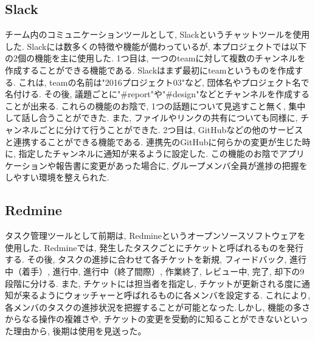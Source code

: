 \subsection{Slack}%
チーム内のコミュニケーションツールとして, Slackというチャットツールを使用した. Slackには数多くの特徴や機能が備わっているが, 本プロジェクトでは以下の2個の機能を主に使用した. 1つ目は, 一つのteamに対して複数のチャンネルを作成することができる機能である. Slackはまず最初にteamというものを作成する. これは, teamの名前は"2016プロジェクト03"など, 団体名やプロジェクト名で名付ける. その後, 議題ごとに"\#report"や"\#design"などとチャンネルを作成することが出来る. これらの機能のお陰で, 1つの話題について見逃すこと無く, 集中して話し合うことができた. また, ファイルやリンクの共有についても同様に, チャンネルごとに分けて行うことができた. 2つ目は, GitHubなどの他のサービスと連携することができる機能である. 連携先のGitHubに何らかの変更が生じた時に, 指定したチャンネルに通知が来るように設定した. この機能のお陰でアプリケーションや報告書に変更があった場合に, グループメンバ全員が進捗の把握をしやすい環境を整えられた.

\subsection{Redmine}%
タスク管理ツールとして前期は, Redmineというオープンソースソフトウェアを使用した. Redmineでは, 発生したタスクごとにチケットと呼ばれるものを発行する. その後, タスクの進捗に合わせて各チケットを新規, フィードバック, 進行中（着手）, 進行中, 進行中（終了間際）, 作業終了, レビュー中, 完了, 却下の9段階に分ける. また, チケットには担当者を指定し, チケットが更新される度に通知が来るようにウォッチャーと呼ばれるものに各メンバを設定する. これにより, 各メンバのタスクの進捗状況を把握することが可能となった.しかし, 機能の多さからなる操作の複雑さや, チケットの変更を受動的に知ることができないといった理由から, 後期は使用を見送った。

